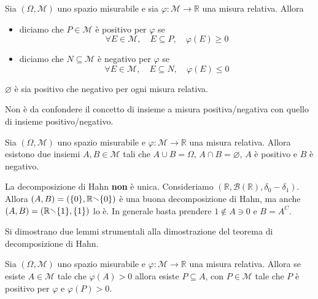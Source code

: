 \begin{definition}
    Sia \((\Omega, \mathcal{M})\) uno spazio misurabile e sia \(\varphi:
    \mathcal{M} \to  \mathbb{R}\) una misura relativa. Allora 
\begin{itemize}[label = --]
    \item diciamo che \(P \in \mathcal{M}\) è positivo per \(\varphi\) se 
        \[
            \forall E \in \mathcal{M}, \quad E \subseteq P, \quad \varphi(E) \ge
            0
        \]
    \item diciamo che \(N \subseteq \mathcal{M} \) è negativo per \(\varphi\) se 
        \[
            \forall E \in \mathcal{M}, \quad E \subseteq N, \quad \varphi(E) \le
            0
        \]
\end{itemize}
\end{definition}
\begin{remark}
    \(\varnothing\) è sia positivo che negativo per ogni misura relativa.
\end{remark}
\begin{remark}
    Non è da confondere il concetto di insieme a misura positiva/negativa
    con quello di insieme positivo/negativo.
\end{remark}
\begin{theorem}
    Sia \((\Omega, \mathcal{M})\) uno spazio misurabile e \(\varphi : \mathcal{M
    \to \mathbb{R}}\) una misura relativa. Allora esistono due insiemi \(A, B
    \in \mathcal{M}\) tali che \(A \cup B = \Omega\), \(A \cap B =
    \varnothing\), \(A\) è positivo e \(B\) è negativo.
\end{theorem}
\begin{remark}
    La decomposizione di Hahn \textbf{non} è unica. Consideriamo \((\mathbb{R},
    \mathcal{B}(\mathbb{R}), \delta_{0} - \delta_{1})\). Allora \((A,
    B) = (\{0\}, \mathbb{R} \sminus \{0\} )\) è una buona decomposizione di
    Hahn, ma anche \((A, B) = (\mathbb{R} \sminus \{1\}, \{1\} )\) lo è. In
    generale basta prendere \(1 \not\in A \ni 0\) e \(B = A^C\).
\end{remark}
Si dimostrano due lemmi strumentali alla dimostrazione del teorema di decomposizione di Hahn.
\begin{lemma}
    Sia \((\Omega, \mathcal{M})\) uno spazio misurabile e \(\varphi :
    \mathcal{M} \to \mathbb{R}\) una misura relativa. Allora se esiste \(A \in
    \mathcal{M}\) tale che \(\varphi(A) > 0\) allora esiste \(P \subseteq A \),
    con \(P \in \mathcal{M}\) tale che \(P\) è positivo per \(\varphi\) e
    \(\varphi(P)>0\).
\end{lemma}
